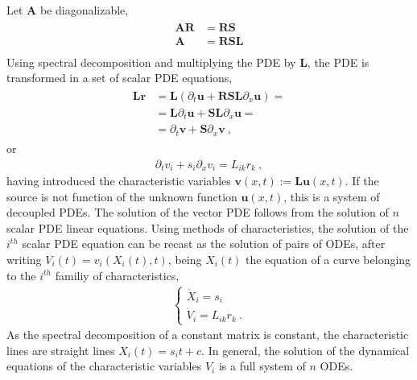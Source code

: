 \documentclass[letterpaper,10pt,english]{jupyterBook}
\begin{document}
\sphinxAtStartPar
{} Let \(\mathbf{A}\) be diagonalizable,
\begin{equation*}
\begin{split}\begin{aligned}
  \mathbf{A} \mathbf{R} & = \mathbf{R} \mathbf{S} \\
  \mathbf{A} & = \mathbf{R} \mathbf{S} \mathbf{L} \\
\end{aligned}\end{split}
\end{equation*}
\sphinxAtStartPar
Using spectral decomposition and multiplying the PDE by \(\mathbf{L}\), the PDE is transformed in a set of scalar PDE equations,
\begin{equation*}
\begin{split}\begin{aligned}
  \mathbf{L} \mathbf{r}
  & = \mathbf{L} \left( \partial_t \mathbf{u} + \mathbf{R} \mathbf{S} \mathbf{L} \partial_x \mathbf{u} \right) = \\
  & = \mathbf{L} \partial_t \mathbf{u} + \mathbf{S} \mathbf{L} \partial_x \mathbf{u} = \\
  & = \partial_t \mathbf{v} + \mathbf{S} \partial_x \mathbf{v} \ ,
\end{aligned}\end{split}
\end{equation*}
\sphinxAtStartPar
or
\begin{equation*}
\begin{split}\partial_t v_i + s_i \partial_x v_i = L_{ik} r_k \ ,\end{split}
\end{equation*}
\sphinxAtStartPar
having introduced the characteristic variables \(\mathbf{v}(x,t) := \mathbf{L} \mathbf{u}(x,t)\). If the source is not function of the unknown function \(\mathbf{u}(x,t)\), this is a system of decoupled PDEs. The solution of the vector PDE follows from the solution of \(n\) scalar PDE linear equations. Using methods of characteristics, the solution of the \(i^{th}\) scalar PDE equation can be recast as the solution of pairs of ODEs, after writing \(V_i(t) = v_i(X_i(t), t)\), being \(X_i(t)\) the equation of a curve belonging to the \(i^{th}\) familiy of characteristics,
\begin{equation*}
\begin{split}\begin{cases}
  \dot{X}_i = s_i \\
  \dot{V}_i = L_{ik} r_k \ .
\end{cases}\end{split}
\end{equation*}
\sphinxAtStartPar
As the spectral decomposition of a constant matrix is constant, the characteristic lines are straight lines \(X_i(t) = s_i t + c\). In general, the solution of the dynamical equations of the characteristic variables \(V_i\) is a full system of \(n\) ODEs.
\end{document}
